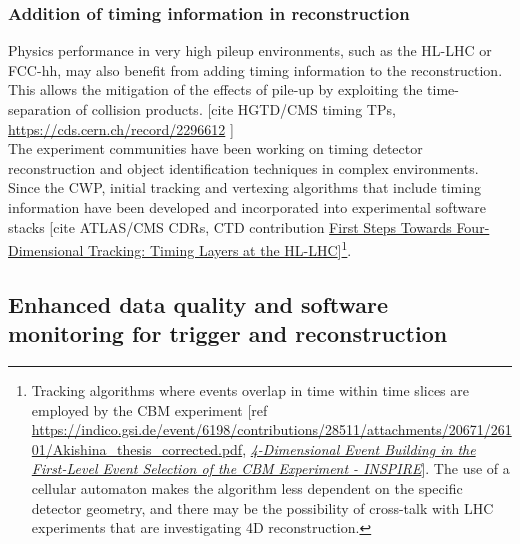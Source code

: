 \documentclass[10pt,a4paper]{article}
\begin{document}
\hypertarget{addition-of-timing-information-in-reconstruction}{%
\subsubsection{Addition of timing information in
reconstruction}\label{addition-of-timing-information-in-reconstruction}}

Physics performance in very high pileup environments, such as the HL-LHC
or FCC-hh, may also benefit from adding timing information to the
reconstruction. This allows the mitigation of the effects of pile-up by
exploiting the time-separation of collision products. {[}cite HGTD/CMS
timing TPs,
\href{https://cds.cern.ch/record/2296612}{{https://cds.cern.ch/record/2296612}}
{]}\\
The experiment communities have been working on timing detector
reconstruction and object identification techniques in complex
environments. Since the CWP, initial tracking and vertexing algorithms
that include timing information have been developed and incorporated
into experimental software stacks {[}cite ATLAS/CMS CDRs, CTD
contribution
\href{https://indico.cern.ch/event/658267/contributions/2870293/attachments/1620243/2577412/TimingCTD_LindseyGray_20032018.pdf}{{First
Steps Towards Four-Dimensional Tracking: Timing Layers at the
HL-LHC}}{]}\footnote{Tracking algorithms where events overlap in time
  within time slices are employed by the CBM experiment {[}ref
  \href{https://indico.gsi.de/event/6198/contributions/28511/attachments/20671/26101/Akishina_thesis_corrected.pdf}{{https://indico.gsi.de/event/6198/contributions/28511/attachments/20671/26101/Akishina\_thesis\_corrected.pdf}},
  \href{https://inspirehep.net/literature/1414007}{\emph{{4-Dimensional
  Event Building in the First-Level Event Selection of the CBM
  Experiment - INSPIRE}}}{]}. The use of a cellular automaton makes the
  algorithm less dependent on the specific detector geometry, and there
  may be the possibility of cross-talk with LHC experiments that are
  investigating 4D reconstruction.}.

\hypertarget{enhanced-data-quality-and-software-monitoring-for-trigger-and-reconstruction}{%
\subsection{Enhanced data quality and software monitoring for trigger
and
reconstruction}\label{enhanced-data-quality-and-software-monitoring-for-trigger-and-reconstruction}}
\end{document}
